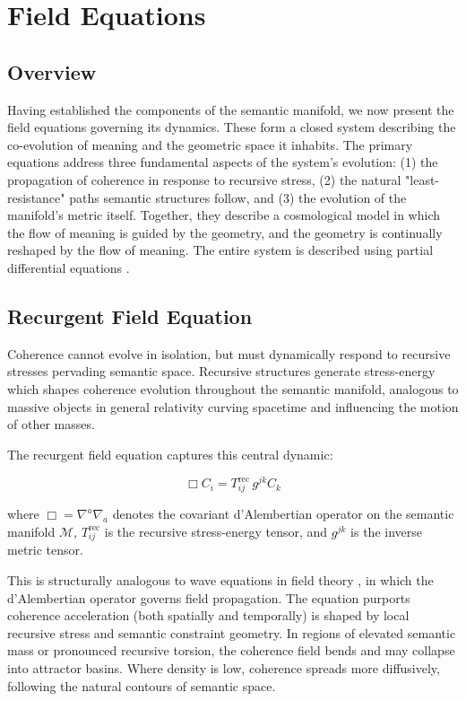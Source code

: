 \chapter{Field Equations}

\section{Overview}

Having established the components of the semantic manifold, we now present the field equations governing its dynamics. These form a closed system describing the co-evolution of meaning and the geometric space it inhabits. The primary equations address three fundamental aspects of the system's evolution: (1) the propagation of coherence in response to recursive stress, (2) the natural "least-resistance" paths semantic structures follow, and (3) the evolution of the manifold's metric itself. Together, they describe a cosmological model in which the flow of meaning is guided by the geometry, and the geometry is continually reshaped by the flow of meaning. The entire system is described using partial differential equations \autocite{Evans2010}.

\section{Recurgent Field Equation}

Coherence cannot evolve in isolation, but must dynamically respond to recursive stresses pervading semantic space. Recursive structures generate stress-energy which shapes coherence evolution throughout the semantic manifold, analogous to massive objects in general relativity curving spacetime and influencing the motion of other masses.

The recurgent field equation captures this central dynamic:

\begin{equation}
\Box C_i = T^{\text{rec}}_{ij} \, g^{jk} C_k
\end{equation}

where \(\Box = \nabla^a \nabla_a\) denotes the covariant d'Alembertian operator on the semantic manifold \(\mathcal{M}\), \(T^{\text{rec}}_{ij}\) is the recursive stress-energy tensor, and \(g^{jk}\) is the inverse metric tensor.

This is structurally analogous to wave equations in field theory \autocite{Ryder1996, Weinberg1995}, in which the d'Alembertian operator governs field propagation. The equation purports coherence acceleration (both spatially and temporally) is shaped by local recursive stress and semantic constraint geometry. In regions of elevated semantic mass or pronounced recursive torsion, the coherence field bends and may collapse into attractor basins. Where density is low, coherence spreads more diffusively, following the natural contours of semantic space.

